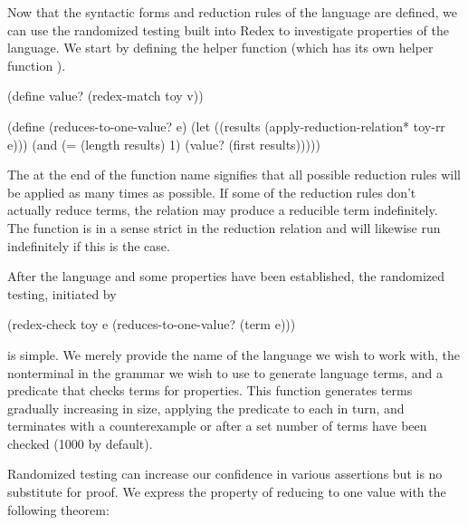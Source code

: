\documentclass[ms,electronic,twosidetoc,letterpaper,chaptercenter,parttop]{byumsphd}
\begin{document}
Now that the syntactic forms and reduction rules of the language are defined, we can use 
the randomized testing built into Redex to investigate properties of the language. We 
start by defining the helper function  (which has its own 
helper function ).
\begin{schemedisplay}
(define value? (redex-match toy v))

(define (reduces-to-one-value? e)
  (let ((results (apply-reduction-relation* toy-rr e)))
    (and (= (length results) 1)
         (value? (first results)))))
\end{schemedisplay}
The \scheme{*} at the end of the function name  signifies
that all possible reduction rules will be applied as many times as possible. If some of
the reduction rules don't actually reduce terms, the relation may produce a reducible term
indefinitely. The function  is in a sense strict in the
reduction relation and will likewise run indefinitely if this is the case.

After the language and some properties have been established, the randomized testing, 
initiated by
\begin{schemedisplay}
(redex-check toy
             e
             (reduces-to-one-value? (term e)))
\end{schemedisplay}
is simple. We merely provide the name of the language we wish to work with, the
nonterminal in the grammar we wish to use to generate language terms, and a predicate that
checks terms for properties. This function generates terms gradually increasing in size,
applying the predicate to each in turn, and terminates with a counterexample or after a
set number of terms have been checked (1000 by default).

Randomized testing can increase our confidence in various assertions but is no substitute 
for proof. We express the property of reducing to one value with the following theorem:
\end{document}
